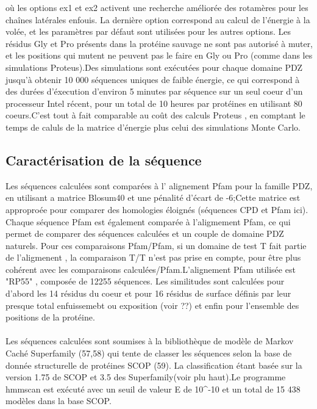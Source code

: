 \begin{enumarete}
où les options ex1 et ex2 activent une recherche améliorée des rotamères pour les chaînes latérales enfouis. La dernière option correspond au calcul de l'énergie à la volée, et les paramètres par défaut sont utilisées pour les autres options.
Les résidus Gly et Pro présents dans la protéine sauvage ne sont pas autorisé à muter, et les positions qui mutent ne peuvent pas le faire en Gly  ou Pro (comme  dans les simulations Proteus).Des simulations sont exécutées pour chaque domaine PDZ jusqu'à obtenir  10 000 séquences uniques de faible énergie, ce qui correspond à des durées d'éxecution d'environ 5 minutes par séquence sur un seul coeur d'un processeur Intel récent, pour un total de 10 heures par protéines en utilisant 80 coeurs.C'est tout à fait comparable au coût des calculs Proteus , en comptant le temps de caluls de la matrice d'énergie plus celui des simulations Monte Carlo.



\subsection{Caractérisation de la séquence}

Les séquences calculées sont comparées à l' alignement Pfam pour la famille PDZ, en utilisant a matrice Blosum40 et une pénalité d'écart de -6;Cette matrice est approproée pour comparer des homologies éloignés (séquences CPD et Pfam ici). Chaque séquence Pfam est également comparée à l'aligmement Pfam, ce qui permet de comparer des séquences calculées et un couple de domaine PDZ naturels. Pour ces comparaisons Pfam/Pfam, si un domaine de test T fait partie de l'aligmenent , la comparaison T/T n'est pas prise en compte, pour être plus cohérent avec les comparaisons calculées/Pfam.L'alignement Pfam utilisée est "RP55" , composée de 12255 séquences. Les similitudes sont calculées pour d'abord les 14 résidus du coeur et pour 16 résidus de surface définis par leur presque total enfuissemebt ou exposition (voir ??)  et enfin pour l'ensemble des positions de la protéine.
\paragraph{}
Les séquences calculées sont soumises à la bibliothèque de modèle de Markov Caché Superfamily (57,58) qui tente de classer les séquences selon la base de donnée structurelle de protéines SCOP (59). La classification étant basée sur la version 1.75 de SCOP et 3.5 des Superfamily(voir plu haut).Le programme hmmscan est exécuté avec un seuil de valeur E de 10^{-10} et un total de 15 438 modèles dans la base SCOP. 


\end{enumarete}
